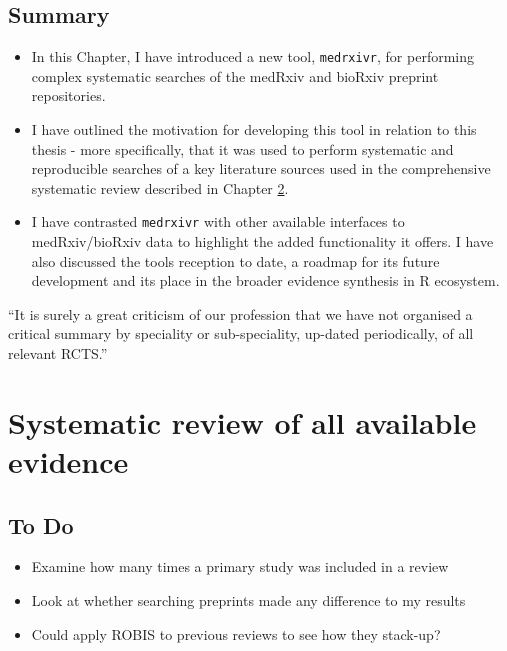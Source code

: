 \documentclass[a4paper, twoside]{templates/ociamthesis}
\providecommand{\tightlist}{%
  \setlength{\itemsep}{0pt}\setlength{\parskip}{0pt}}
\begin{document}
\hypertarget{summary}{%
\section{Summary}\label{summary}}

\begin{itemize}
\item
  In this Chapter, I have introduced a new tool, \texttt{medrxivr}, for performing complex systematic searches of the medRxiv and bioRxiv preprint repositories.
\item
  I have outlined the motivation for developing this tool in relation to this thesis - more specifically, that it was used to perform systematic and reproducible searches of a key literature sources used in the comprehensive systematic review described in Chapter \ref{sys-rev-heading}.
\item
  I have contrasted \texttt{medrxivr} with other available interfaces to medRxiv/bioRxiv data to highlight the added functionality it offers. I have also discussed the tools reception to date, a roadmap for its future development and its place in the broader evidence synthesis in R ecosystem.
\end{itemize}

\begin{savequote}
``It is surely a great criticism of our profession that we have not
organised a critical summary by speciality or sub-speciality, up-dated
periodically, of all relevant RCTS.''
\end{savequote}



\hypertarget{sys-rev-heading}{%
\chapter{Systematic review of all available evidence}\label{sys-rev-heading}}

\minitoc 

\hypertarget{to-do}{%
\section{To Do}\label{to-do}}

\begin{itemize}
\tightlist
\item
  Examine how many times a primary study was included in a review\\
\item
  Look at whether searching preprints made any difference to my results
\item
  Could apply ROBIS to previous reviews to see how they stack-up?
\end{itemize}
\end{document}
